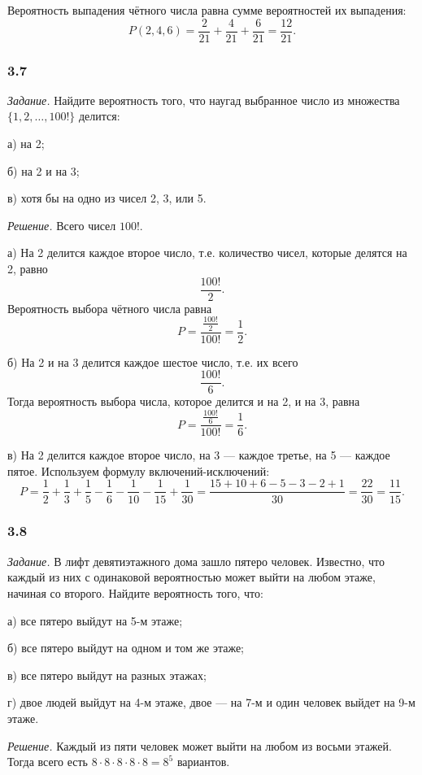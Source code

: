 \documentclass{book}
\begin{document}
Вероятность выпадения чётного числа равна сумме вероятностей их выпадения:
$$P \left( 2, 4, 6 \right) =
\frac{2}{21} + \frac{4}{21} + \frac{6}{21} =
\frac{12}{21}.$$

\subsubsection*{3.7}

\textit{Задание.} Найдите вероятность того, что наугад выбранное число из множества $\{ 1, 2, \dotsc, 100!\}$ делится:

а) на 2;

б) на 2 и на 3;

в) хотя бы на одно из чисел 2, 3, или 5.

\textit{Решение.} Всего чисел $100!$.

а) На 2 делится каждое второе число, т.е. количество чисел, которые делятся на 2, равно
$$\frac{100!}{2}.$$
Вероятность выбора чётного числа равна
$$P =
\frac{ \frac{100!}{2} }{100!} =
\frac{1}{2}.$$

б) На 2 и на 3 делится каждое шестое число, т.е. их всего
$$ \frac{100!}{6}.$$
Тогда вероятность выбора числа, которое делится и на 2, и на 3, равна
$$P =
\frac{ \frac{100!}{6} }{100!} =
\frac{1}{6}.$$

в) На 2 делится каждое второе число, на 3 --- каждое третье, на 5 --- каждое пятое.
Используем формулу включений-исключений:
$$P =
\frac{1}{2} + \frac{1}{3} + \frac{1}{5} - \frac{1}{6} - \frac{1}{10} - \frac{1}{15} + \frac{1}{30} =
\frac{15+10+6-5-3-2+1}{30} =
\frac{22}{30} =
\frac{11}{15}.$$

\subsubsection*{3.8}

\textit{Задание.} В лифт девятиэтажного дома зашло пятеро человек.
Известно, что каждый из них с одинаковой вероятностью может выйти на любом этаже, начиная со второго.
Найдите вероятность того, что:

а) все пятеро выйдут на 5-м этаже;

б) все пятеро выйдут на одном и том же этаже;

в) все пятеро выйдут на разных этажах;

г) двое людей выйдут на 4-м этаже, двое --- на 7-м и один человек выйдет на 9-м этаже.

\textit{Решение.} Каждый из пяти человек может выйти на любом из восьми этажей.
Тогда всего есть $8 \cdot 8 \cdot 8 \cdot 8 \cdot 8 = 8^5$ вариантов.
\end{document}
